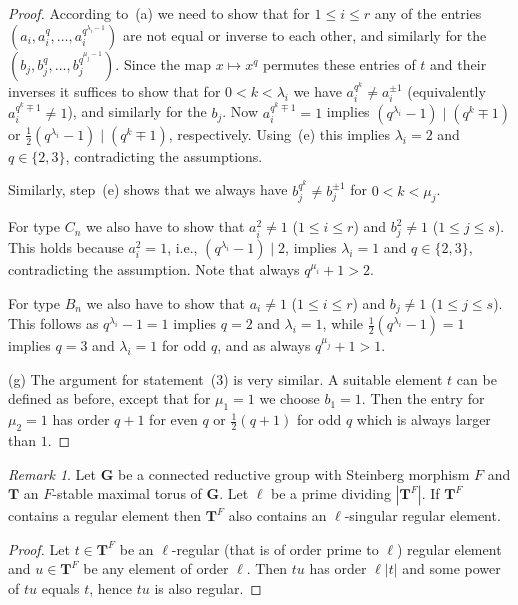 \documentclass{ert-l}
\newcommand{\bG}{{\mathbf{G}}}
\newcommand{\bT}{{\mathbf{T}}}
\let\la=\lambda
\theoremstyle{definition}
\theoremstyle{remark}
\newtheorem{rem}[thm]{Remark}
\begin{document}
\begin{proof}
According to~(a)  we need to show that for $1\leq i \leq r$ any of the entries
$(a_i, a_i^q, \ldots, a_i^{q^{\la_i-1}})$ are not equal or inverse to each
other, and similarly for the $(b_j, b_j^q, \ldots, b_j^{q^{\mu_j-1}})$.
Since the map $x \mapsto x^q$ permutes these entries of $t$ and their
inverses it suffices to show that for $0 <k <\la_i$ we have $a_i^{q^k} \neq
a_i^{\pm 1}$ (equivalently $a_i^{q^k\mp 1} \neq 1$), and similarly for
the $b_j$. Now $a_i^{q^k\mp 1} = 1$ implies $(q^{\la_i}-1) \mid (q^k \mp
1)$ or $\frac{1}{2}(q^{\la_i}-1) \mid (q^k \mp 1)$, respectively. Using~(e)
this implies $\la_i = 2$ and $q\in \{2,3\}$, contradicting the assumptions.

Similarly, step~(e) shows that we always have $b_j^{q^k} \neq b_j^{\pm 1}$
for $0 < k < \mu_j$.

For type $C_n$ we also have to show that $a_i^2 \neq 1$ ($1\leq i \leq r$)
and $b_j^2 \neq 1$ ($1\leq j\leq s$). This holds because $a_i^2 =1$,
i.e., $(q^{\la_i} -1) \mid 2$, implies $\la_i =1$ and $q \in
\{2,3\}$, contradicting the assumption. Note that always $q^{\mu_i}+1 > 2$.

For type $B_n$ we also have to show that $a_i \neq 1$ ($1\leq i \leq r$)
and $b_j \neq 1$ ($1\leq j\leq s$). This follows as $q^{\la_i}-1 = 1$ implies
$q=2$ and $\la_i=1$, while $\frac{1}{2}(q^{\la_i}-1) = 1$ implies $q=3$ and
$\la_i=1$ for odd $q$, and as always $q^{\mu_j}+1 >1$.

(g) The argument for statement~(3) is very similar. A suitable element $t$
can be defined as before, except that for $\mu_1=1$ we choose $b_1  = 1$.
Then the entry for $\mu_2=1$ has order $q+1$ for even $q$ or
$\frac{1}{2}(q+1)$ for odd $q$ which is always larger than $1$.
\end{proof}

\begin{rem}   \label{rem:lsingreg}
Let $\bG$ be a connected reductive group with Steinberg morphism $F$ and
$\bT$ an $F$-stable maximal torus of $\bG$. Let $\ell$ be a prime dividing
$|\bT^F|$. If $\bT^F$ contains a regular element then $\bT^F$ also contains
an $\ell$-singular regular element.
\end{rem}

\begin{proof}
Let $t\in \bT^F$ be an $\ell$-regular (that is of order prime to $\ell$)
regular element  and $u\in \bT^F$ be any element of order $\ell$. Then $tu$
has order $\ell |t|$ and some power of $tu$ equals $t$, hence $tu$ is also
regular.
\end{proof}
\end{document}
